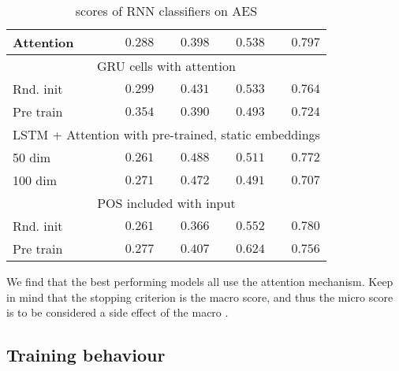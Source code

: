 \begin{table}
\begin{tabular}{lrrrr}
    Attention &         $0.288$  &         $0.398$  &         $0.538$  &         $0.797$  \\
    \midrule
              \multicolumn{5}{c}{GRU cells with attention} \\
    \midrule
    Rnd. init &         $0.299$  &         $0.431$  &         $0.533$  &         $0.764$  \\
    Pre train & $\mathbf{0.354}$ &         $0.390$  &         $0.493$  &         $0.724$  \\
    \midrule
              \multicolumn{5}{c}{LSTM + Attention with pre-trained, static embeddings} \\
    \midrule
    50 dim    &         $0.261$  & $\mathbf{0.488}$ &         $0.511$  &         $0.772$  \\
    100 dim   &         $0.271$  &         $0.472$  &         $0.491$  &         $0.707$  \\
    \midrule
              \multicolumn{5}{c}{POS included with input} \\
    \midrule
    Rnd. init &         $0.261$  &         $0.366$  &         $0.552$  &         $0.780$  \\
    Pre train &         $0.277$  &         $0.407$  & $\mathbf{0.624}$ &         $0.756$  \\
    \bottomrule
  \end{tabular}
  \caption{\FI scores of RNN classifiers on AES}
  \label{tab:rnn-results}
\end{table}

We find that the best performing models all use the attention mechanism.
Keep in mind that the stopping criterion is the macro \FI score, and thus
the micro \FI score is to be considered a side effect of the macro \FI.

\subsection{Training behaviour}

